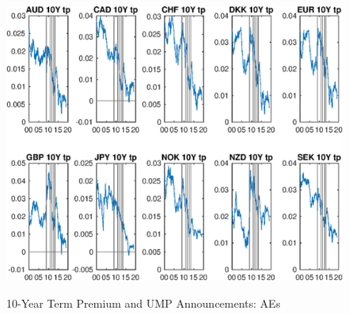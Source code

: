 \documentclass{article}
\begin{document}
\begin{figure}[tbph]
	\begin{center}
		\caption{10-Year Term Premium and UMP Announcements: AEs}
		\label{fig:ny_tp_QE_AE}
		\includegraphics[trim={0cm 0cm 0cm 0cm},clip,height=1\textheight,width=1.4\textwidth]{../Figures/Estimation/ny_tp_QE_AE.eps} \\
	\end{center}
\end{figure}
\end{document}
